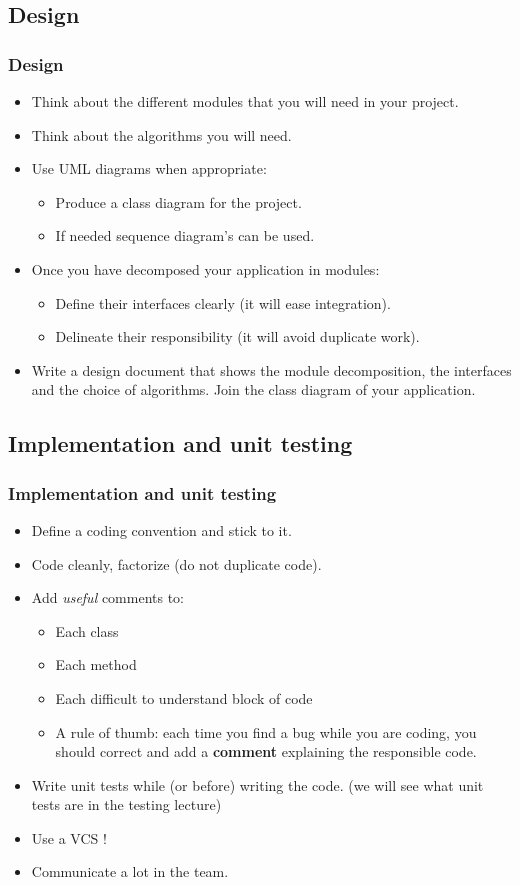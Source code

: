 \documentclass[10pt]{beamer}
\begin{document}
\subsection{Design}
\begin{frame}
  \frametitle{Design}
  \begin{itemize}
  \item Think about the different modules that you will need in your project.
  \item Think about the algorithms you will need.
  \item Use UML diagrams when appropriate:
    \begin{itemize}
      \item Produce a class diagram for the project.
      \item If needed sequence diagram's can be used.
    \end{itemize}
  \item Once you have decomposed your application in modules:
    \begin{itemize}
    \item Define their interfaces clearly (it will ease integration).
    \item Delineate their responsibility (it will avoid duplicate work).
    \end{itemize}
  \item Write a design document that shows the module decomposition, the
    interfaces and the choice of algorithms. Join the class diagram of your application.
  \end{itemize}
\end{frame}

\subsection{Implementation and unit testing}
\begin{frame}
  \frametitle{Implementation and unit testing}
  \begin{itemize}
  \item Define a coding convention and stick to it.
  \item Code cleanly, factorize (do not duplicate code).
  \item Add \emph{useful} comments to:
    \begin{itemize}
    \item Each class
    \item Each method
    \item Each difficult to understand block of code
    \item A rule of thumb: each time you find a bug while you are coding,
      you should correct and add a \textbf{comment} explaining the responsible code.
    \end{itemize}
  \item Write unit tests while (or before) writing the code. (we will see what
    unit tests are in the testing lecture)
  \item Use a VCS !
  \item Communicate a lot in the team.
  \end{itemize}
\end{frame}
\end{document}
